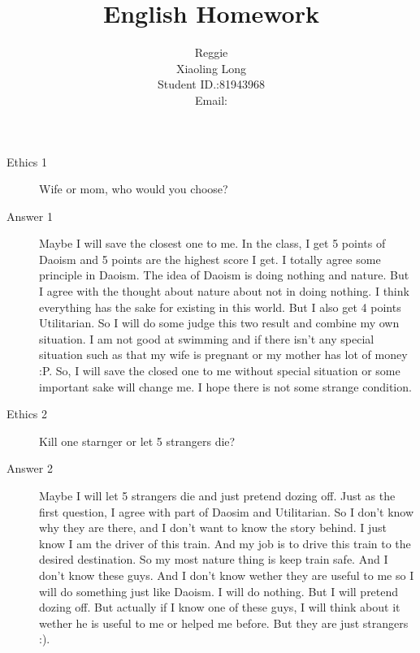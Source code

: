 \documentclass[a4paper]{article}
\title{English Homework}
\author{Reggie \\Xiaoling Long\\Student ID.:81943968\\Email:\email{longxl@shanghaitech.edu.cn}}
\begin{document}
\maketitle
\begin{description}
  \item[Ethics 1]Wife or mom, who would you choose?
  \item[Answer 1]
    Maybe I will save the closest one to me. In the class, I get 5 points of Daoism and 5 points are the highest score I get.
    I totally agree some principle in Daoism. The idea of Daoism is doing nothing and nature. But I agree with the thought about nature
    about not in doing nothing. I think everything has the sake for existing in this world.
    But I also get 4 points Utilitarian. So I will do some judge this two result and combine my own situation.
    I am not good at swimming and if there isn't any special situation such as that my wife is pregnant or my mother has lot of money :P.
    So, I will save the closed one to me without special situation or some important sake will change me. I hope there is not some strange condition.
  \item[Ethics 2]Kill one starnger or let 5 strangers die?
  \item[Answer 2]Maybe I will let 5 strangers die and just pretend dozing off. Just as the first question,
  I agree with part of Daosim and Utilitarian. So I don't know why they are there, and I don't want to know the story behind. I just know
  I am the driver of this train. And my job is to drive this train to the desired destination. So my most nature thing
  is keep train safe. And I don't know these guys. And I don't know wether they are useful to me
  so I will do something just like Daoism. I will do nothing. But I will pretend dozing off. But actually if I know one of these
  guys, I will think about it wether he is useful to me or helped me before. But they are just strangers :).
\end{description}
\end{document}
